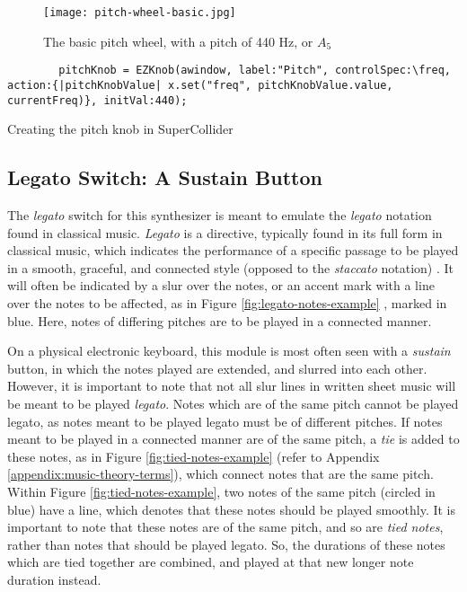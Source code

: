 \begin{figure}
  \centering
  \texttt{[image: pitch-wheel-basic.jpg]}
  \caption{The basic pitch wheel, with a pitch of 440 Hz, or $A_5$}
  \label{fig:pitch-wheel-basic}
\end{figure}

\begin{listing}
	\begin{lstlisting}
		pitchKnob = EZKnob(awindow, label:"Pitch", controlSpec:\freq, action:{|pitchKnobValue| x.set("freq", pitchKnobValue.value, currentFreq)}, initVal:440);
	\end{lstlisting}
	\caption{Creating the pitch knob in SuperCollider}
	\label{lst:pitch-knob-waveform}
\end{listing}



\subsection{Legato Switch: A Sustain Button}

The \textit{legato} switch for this synthesizer is meant to emulate the \textit{legato} notation found in classical music. \textit{Legato} is a directive, typically found in its full form in classical music, which indicates the performance of a specific passage to be played in a smooth, graceful, and connected style (opposed to the \textit{staccato} notation) \cite{Winer_2018}. It will often be indicated by a slur over the notes, or an accent mark with a line over the notes to be affected, as in Figure \ref{fig:legato-notes-example} \cite{Henle_2009}, marked in blue. Here, notes of differing pitches are to be played in a connected manner. 

On a physical electronic keyboard, this module is most often seen with a \textit{sustain} button, in which the notes played are extended, and slurred into each other. However, it is important to note that not all slur lines in written sheet music will be meant to be played \textit{legato}. Notes which are of the same pitch cannot be played legato, as notes meant to be played legato must be of different pitches. If notes meant to be played in a connected manner are of the same pitch, a \textit{tie} is added to these notes, as in Figure \ref{fig:tied-notes-example} \cite{Lung_2016} (refer to Appendix \ref{appendix:music-theory-terms}), which connect notes that are the same pitch. Within Figure \ref{fig:tied-notes-example}, two notes of the same pitch (circled in blue) have a line, which denotes that these notes should be played smoothly. It is important to note that these notes are of the same pitch, and so are \textit{tied notes}, rather than notes that should be played legato. So, the durations of these notes which are tied together are combined, and played at that new longer note duration instead. 

